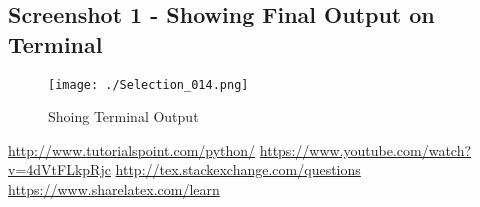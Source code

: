 \documentclass[a4paper,10pt]{article}
\begin{document}
\subsection{Screenshot 1 - Showing Final Output on Terminal}

\begin{figure}[h]
 \centering
 \texttt{[image: ./Selection\_014.png]}
 \caption{Shoing Terminal Output}
 \label{fig:1}
\end{figure}

\newpage %
\begin{thebibliography}{widestlabel} %
\bibitem{}\url{http://www.tutorialspoint.com/python/}          %
\bibitem{}\url{https://www.youtube.com/watch?v=4dVtFLkpRjc}
\bibitem{}\url{http://tex.stackexchange.com/questions}
\bibitem{}\url{https://www.sharelatex.com/learn}

\end{thebibliography} %
 
\end{document}
